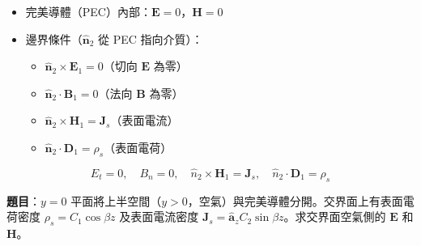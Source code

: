 \documentclass[12pt,a4paper]{article}
\newcommand{\vE}{\mathbf{E}}
\newcommand{\vB}{\mathbf{B}}
\newcommand{\vH}{\mathbf{H}}
\newcommand{\vJ}{\mathbf{J}}
\newcommand{\vD}{\mathbf{D}}
\newcommand{\az}{\hat{\mathbf{a}}_z}
\begin{document}
\begin{conceptbox}[核心概念]
\begin{itemize}
  \item 完美導體（PEC）內部：$\vE = 0$，$\vH = 0$
  \item 邊界條件（$\hat{\mathbf{n}}_2$ 從 PEC 指向介質）：
    \begin{itemize}
      \item $\hat{\mathbf{n}}_2 \times \vE_1 = 0$（切向 $\vE$ 為零）
      \item $\hat{\mathbf{n}}_2 \cdot \vB_1 = 0$（法向 $\vB$ 為零）
      \item $\hat{\mathbf{n}}_2 \times \vH_1 = \vJ_s$（表面電流）
      \item $\hat{\mathbf{n}}_2 \cdot \vD_1 = \rho_s$（表面電荷）
    \end{itemize}
\end{itemize}
\end{conceptbox}

\begin{formulabox}
\[
  E_t = 0, \quad B_n = 0, \quad \hat{n}_2\times\vH_1 = \vJ_s, \quad \hat{n}_2\cdot\vD_1 = \rho_s
\]
\end{formulabox}

\textbf{題目}：$y=0$ 平面將上半空間（$y>0$，空氣）與完美導體分開。交界面上有表面電荷密度 $\rho_s = C_1\cos\beta z$ 及表面電流密度 $\vJ_s = \az C_2\sin\beta z$。求交界面空氣側的 $\vE$ 和 $\vH$。
\end{document}
